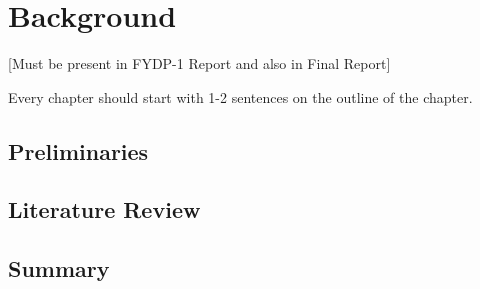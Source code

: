 \chapter{Background}

[Must be present in FYDP-1 Report and also in Final Report]

Every chapter should start with 1-2 sentences on the outline of the chapter.

\section{Preliminaries}
\section{Literature Review}
\section{Summary}
